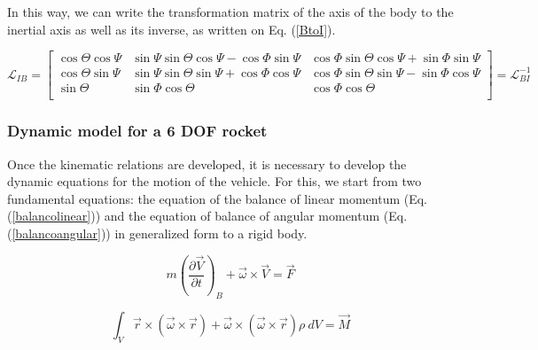 \documentclass[10pt,fleqn,a4paper,twoside]{article}
\begin{document}

In this way, we can write the transformation matrix of the axis of the body to the inertial axis as well as its inverse, as written on Eq. (\ref{BtoI}).

\begin{equation}
\mathcal{L}_{IB}=
\begin{bmatrix}
\cos\Theta\cos\Psi & \sin\Psi\sin\Theta\cos\Psi-\cos\Phi\sin\Psi & \cos\Phi\sin\Theta\cos\Psi+\sin\Phi\sin\Psi\\
\cos\Theta\sin\Psi & \sin\Psi\sin\Theta\sin\Psi+\cos\Phi\cos\Psi & \cos\Phi\sin\Theta\sin\Psi-\sin\Phi\cos\Psi\\
\sin\Theta & \sin\Phi\cos\Theta & \cos\Phi\cos\Theta\\
\end{bmatrix}=\mathcal{L}_{BI}^{-1}
\label{BtoI}
\end{equation}




\subsubsection{Dynamic model for a 6 DOF rocket}


Once the kinematic relations are developed, it is necessary to develop the dynamic equations for the motion of the vehicle. For this, we start from two fundamental equations: the equation of the balance of linear momentum (Eq. (\ref{balancolinear})) and the equation of balance of angular momentum (Eq. (\ref{balancoangular})) in generalized form to a rigid body.


\begin{equation}
{m}\left( \frac{\partial \vec{V}}{\partial t}\right)_{B}+\vec{\omega}\times \vec{V}=\vec{F} 
\label{balancolinear}
\end{equation}

\begin{equation}
\int_{V} \vec{r}\times (\vec{\omega}\times \vec{r})+\vec{\omega}\times(\vec{\omega}\times \vec{r})  \rho \ dV = \vec{M}
\label{balancoangular}
\end{equation}
\end{document}
